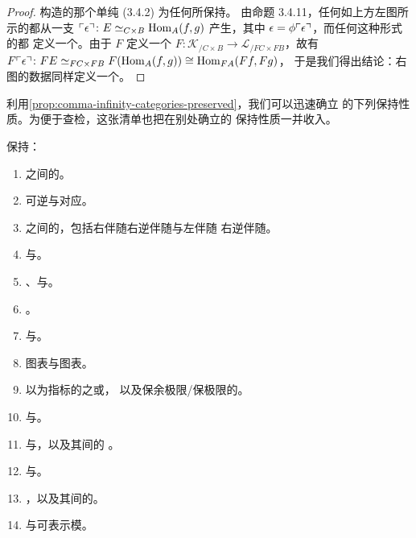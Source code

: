 \begin{proof}
构造\trCommaCone{}的那个单纯\trPullback{} (3.4.2) 为任何\trCosmologicalFunctor{}所保持。
由命题 3.4.11，任何如上方左图所示的\trCommaCone{}都从一支\trFiberedEquivalence
$\ulcorner \epsilon\urcorner\colon E\simeq_{C\times B}\mathrm{Hom}_{A}(f,g)$ 产生，其中
$\epsilon=\phi\ulcorner \epsilon\urcorner$，而任何这种形式的\trFiberedEquivalence{}都%
定义一个\trCommaCone。由于 $F$ 定义一个\trCosmologicalFunctor{}
$F\colon\mathcal{K}_{/C\times B}\to\mathcal{L}_{/FC\times FB}$，故有
$F\ulcorner \epsilon\urcorner\colon FE\simeq_{FC\times FB}F(\mathrm{Hom}_{A}(f,g))\cong\mathrm{Hom}_{FA}(Ff,Fg)$，
于是我们得出结论：右图的数据同样定义一个\trCommaCone。
\end{proof}

利用\cref{prop:comma-infinity-categories-preserved}，我们可以迅速确立%
\trCosmologicalFunctor{}的下列保持性质。为便于查检，这张清单也把在别处确立的
保持性质一并收入。

\begin{proposition}\label{prop:cosmological-preservation-properties}
\trCosmologicalFunctor{}保持：
\begin{enumerate}[label=(\roman*)]
\item \trInfinityCategory{}之间的\trEquivalence。
\item 可逆\trNaturalTransformation{}与对应。
\item \trInfinityCategory{}之间的\trAdjunction，包括右伴随右逆伴随与左伴随
  右逆伴随。
\item \trFiberedAdjunction{}与\trFiberedEquivalence。
\item \trIsofibration、\trTrivialFibration{}与\trDiscrete{}\trInfinityCategory。
\item \trFlexibleWeightedLimit。
\item \trCommaSpan{}与\trCommaCone。
\item \trAbsoluteRightLifting{}图表与\trAbsoluteLeftLifting{}图表。
\item 以\trSimplicialSet{}为指标的\trDiagram{}之\trLimit{}或\trColimit，
  以及保余极限/保极限的\trFunctor。
\item \trStable{}\trInfinityCategory{}与\trExactFunctor。
\item \trCartesianFibration{}与\trCocartesianFibration，以及其间的%
  \trCartesianFunctor。
\item \trDiscreteCartesianFibration{}与\trDiscreteCocartesianFibration。
\item \trTwoSidedFibration，以及其间的\trCartesianFunctor。
\item \trModule{}与可表示模。
\end{enumerate}
\end{proposition}

